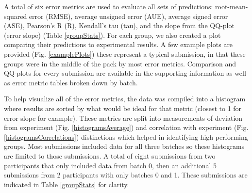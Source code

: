 A total of six error metrics are used to evaluate all sets of predictions: root-mean-squared error (RMSE), average unsigned error (AUE), average signed error (ASE), Pearson's R (R), Kendall's tau (tau), and the slope from the QQ-plot (error slope) (Table \ref{groupStats}). 
For each group, we also created a plot comparing their predictions to experimental results.
A few example plots are provided (Fig. \ref{examplePlots}) these represent a typical submission, in that these groups were in the middle of the pack by most error metrics. 
Comparison and QQ-plots for every submission are available in the supporting information as well as error metric tables broken down by batch. 

\begin{figure*} %
\caption{}
\label{histogramsAverage}       %
\end{figure*}

\begin{figure*} %
\caption{}
\label{histogramsCorrelations}       %
\end{figure*}

To help visualize all of the error metrics, the data was compiled into a histogram where results are sorted by what would be ideal for that metric (closest to 1 for error slope for example). 
These metrics are split into measurements of deviation from experiment (Fig. \ref{histogramsAverage}) and correlation with experiment (Fig. \ref{histogramsCorrelations}) distinctions which helped in identifying high performing groups. 
Most submissions included data for all three batches so these histograms are limited to those submissions. 
A total of eight submissions from two participants that only included data from batch 0, then an additional 5 submissions from 2 participants with only batches 0 and 1.
These submissions are indicated in Table \ref{groupStats} for clarity.

